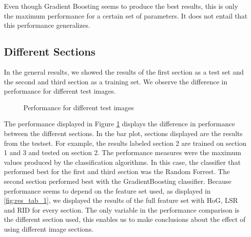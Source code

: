 Even though Gradient Boosting seems to produce the best results, this is only the maximum performance for a certain set of parameters. It does not entail that this performance generalizes.

\subsection{Different Sections}


In the general results, we showed the results of the first section as a test set and the second and third section as a training set. We observe the difference in performance for different test images. 

\datatwo

\begin{figure}
	\caption{Performance for different test images}
	\label{fig:res_bar_2}
\end{figure}

The performance displayed in Figure \ref{fig:res_bar_2} displays the difference in performance between the different sections. In the bar plot, sections displayed are the results from the testset. For example, the results labeled section 2 are trained on section 1 and 3 and tested on section 2. The performance measures were the maximum values produced by the classification algorithms. In this case, the classifier that performed best for the first and third section was the Random Forrest. The second section performed best with the GradientBoosting classifier. Because performance seems to depend on the feature set used, as displayed in \ref{fig:res_tab_1}, we displayed the results of the full feature set with HoG, LSR and RID for every section. The only variable in the performance comparison is the different section used, this enables us to make conclusions about the effect of using different image sections.

